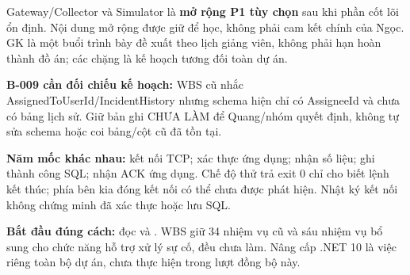 Gateway/Collector và Simulator là \textbf{mở rộng P1 tùy chọn} sau khi phần cốt lõi ổn định. Nội dung mở rộng được giữ để học, không phải cam kết chính của Ngọc. GK là một buổi trình bày đề xuất theo lịch giảng viên, không phải hạn hoàn thành đồ án; các chặng là kế hoạch tương đối toàn dự án.

\textbf{B-009 cần đối chiếu kế hoạch:} WBS cũ nhắc AssignedToUserId/IncidentHistory nhưng schema hiện chỉ có AssigneeId và chưa có bảng lịch sử. Giữ bản ghi CHƯA LÀM để Quang/nhóm quyết định, không tự sửa schema hoặc coi bảng/cột cũ đã tồn tại.

\textbf{Năm mốc khác nhau:} kết nối TCP; xác thực ứng dụng; nhận số liệu; ghi thành công SQL; nhận ACK ứng dụng. Chế độ thử trả exit 0 chỉ cho biết lệnh kết thúc; phía bên kia đóng kết nối có thể chưa được phát hiện. Nhật ký kết nối không chứng minh đã xác thực hoặc lưu SQL.

\textbf{Bắt đầu đúng cách:} đọc  và . WBS giữ 34 nhiệm vụ cũ và sáu nhiệm vụ bổ sung cho chức năng hỗ trợ xử lý sự cố, đều chưa làm. Nâng cấp .NET 10 là việc riêng toàn bộ dự án, chưa thực hiện trong lượt đồng bộ này.
\newpage
